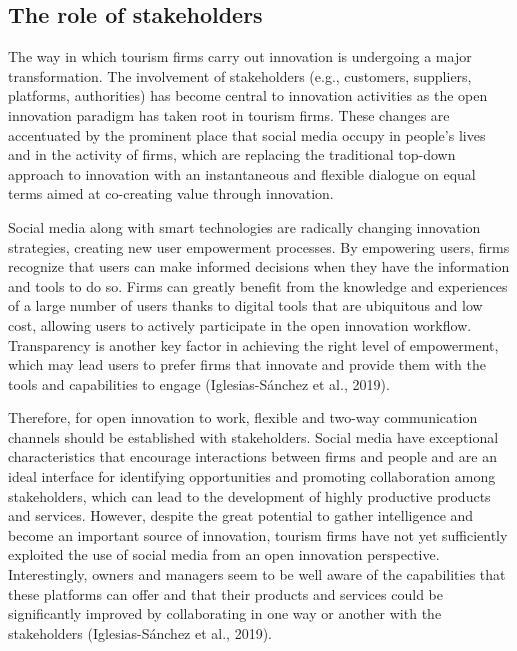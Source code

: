 \documentclass[
  letterpaper,
  DIV=11,
  numbers=noendperiod]{scrreprt}
\begin{document}
\hypertarget{the-role-of-stakeholders}{%
\subsection{The role of stakeholders}\label{the-role-of-stakeholders}}

The way in which tourism firms carry out innovation is undergoing a
major transformation. The involvement of stakeholders (e.g., customers,
suppliers, platforms, authorities) has become central to innovation
activities as the open innovation paradigm has taken root in tourism
firms. These changes are accentuated by the prominent place that social
media occupy in people's lives and in the activity of firms, which are
replacing the traditional top-down approach to innovation with an
instantaneous and flexible dialogue on equal terms aimed at co-creating
value through innovation.

Social media along with smart technologies are radically changing
innovation strategies, creating new user empowerment processes. By
empowering users, firms recognize that users can make informed decisions
when they have the information and tools to do so. Firms can greatly
benefit from the knowledge and experiences of a large number of users
thanks to digital tools that are ubiquitous and low cost, allowing users
to actively participate in the open innovation workflow. Transparency is
another key factor in achieving the right level of empowerment, which
may lead users to prefer firms that innovate and provide them with the
tools and capabilities to engage (Iglesias-Sánchez et al., 2019).

Therefore, for open innovation to work, flexible and two-way
communication channels should be established with stakeholders. Social
media have exceptional characteristics that encourage interactions
between firms and people and are an ideal interface for identifying
opportunities and promoting collaboration among stakeholders, which can
lead to the development of highly productive products and services.
However, despite the great potential to gather intelligence and become
an important source of innovation, tourism firms have not yet
sufficiently exploited the use of social media from an open innovation
perspective. Interestingly, owners and managers seem to be well aware of
the capabilities that these platforms can offer and that their products
and services could be significantly improved by collaborating in one way
or another with the stakeholders (Iglesias-Sánchez et al., 2019).
\end{document}
